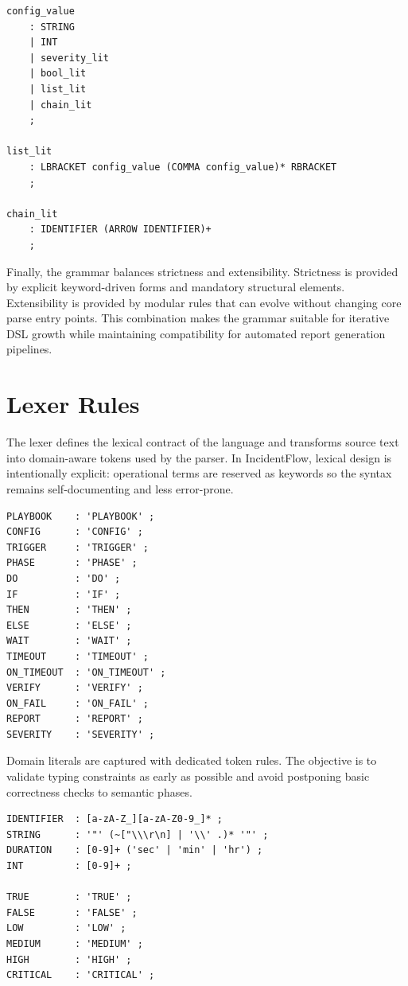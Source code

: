 \begin{lstlisting}
config_value
    : STRING
    | INT
    | severity_lit
    | bool_lit
    | list_lit
    | chain_lit
    ;

list_lit
    : LBRACKET config_value (COMMA config_value)* RBRACKET
    ;

chain_lit
    : IDENTIFIER (ARROW IDENTIFIER)+
    ;
\end{lstlisting}

Finally, the grammar balances strictness and extensibility. Strictness is provided by explicit keyword-driven forms and mandatory structural elements. Extensibility is provided by modular rules that can evolve without changing core parse entry points. This combination makes the grammar suitable for iterative DSL growth while maintaining compatibility for automated report generation pipelines.

\section{Lexer Rules}

The lexer defines the lexical contract of the language and transforms source text into domain-aware tokens used by the parser. In IncidentFlow, lexical design is intentionally explicit: operational terms are reserved as keywords so the syntax remains self-documenting and less error-prone.

\begin{lstlisting}
PLAYBOOK    : 'PLAYBOOK' ;
CONFIG      : 'CONFIG' ;
TRIGGER     : 'TRIGGER' ;
PHASE       : 'PHASE' ;
DO          : 'DO' ;
IF          : 'IF' ;
THEN        : 'THEN' ;
ELSE        : 'ELSE' ;
WAIT        : 'WAIT' ;
TIMEOUT     : 'TIMEOUT' ;
ON_TIMEOUT  : 'ON_TIMEOUT' ;
VERIFY      : 'VERIFY' ;
ON_FAIL     : 'ON_FAIL' ;
REPORT      : 'REPORT' ;
SEVERITY    : 'SEVERITY' ;
\end{lstlisting}

Domain literals are captured with dedicated token rules. The objective is to validate typing constraints as early as possible and avoid postponing basic correctness checks to semantic phases.

\begin{lstlisting}
IDENTIFIER  : [a-zA-Z_][a-zA-Z0-9_]* ;
STRING      : '"' (~["\\\r\n] | '\\' .)* '"' ;
DURATION    : [0-9]+ ('sec' | 'min' | 'hr') ;
INT         : [0-9]+ ;

TRUE        : 'TRUE' ;
FALSE       : 'FALSE' ;
LOW         : 'LOW' ;
MEDIUM      : 'MEDIUM' ;
HIGH        : 'HIGH' ;
CRITICAL    : 'CRITICAL' ;
\end{lstlisting}


